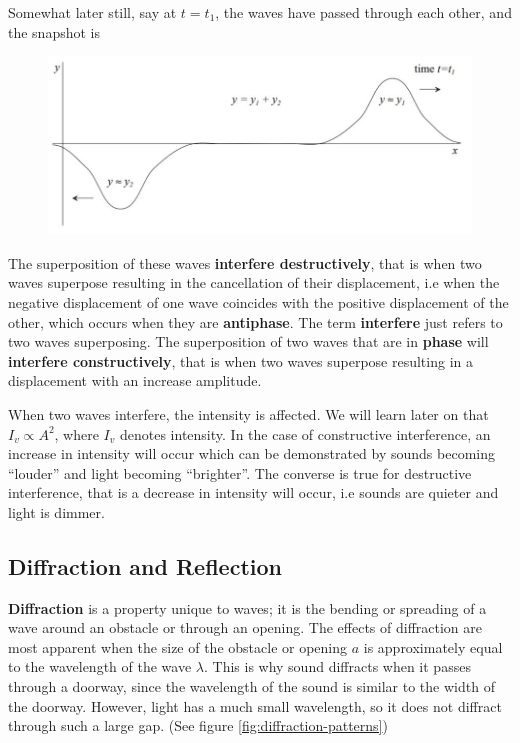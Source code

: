 \FloatBarrier
\noindent Somewhat later still, say at $t = t_1$, the waves have passed through each other, and the snapshot is
\begin{figure}[h!]
    \centering
    \includegraphics{notes/images/Superposition-3.JPG}
\end{figure}
\FloatBarrier

The superposition of these waves \textbf{interfere destructively}, that is when two waves superpose resulting in the cancellation of their displacement, i.e when the negative displacement of one wave coincides with the positive displacement of the other, which occurs when they are \textbf{antiphase}. The term \textbf{interfere} just refers to two waves superposing. The superposition of two waves that are in \textbf{phase} will \textbf{interfere constructively}, that is when two waves superpose resulting in a displacement with an increase amplitude. 

When two waves interfere, the intensity is affected. We will learn later on that $I_v \propto A^2$, where $I_v$ denotes intensity. In the case of constructive interference, an increase in intensity will occur which can be demonstrated by sounds  becoming ``louder'' and light becoming ``brighter''. The converse is true for destructive interference, that is a decrease in intensity will occur, i.e sounds are quieter and light is dimmer. 

\subsection{Diffraction and Reflection}

\textbf{Diffraction} is a property unique to waves; it is the bending or spreading of a wave around an obstacle or through an opening. The effects of diffraction are most apparent when the size of the obstacle or opening $a$ is approximately equal to the wavelength of the wave $\lambda$. This is why sound diffracts when it passes through a doorway, since the wavelength of the sound is similar to the width of the doorway. However, light has a much small wavelength, so it does not diffract through such a large gap. (See figure \ref{fig:diffraction-patterns}) 

